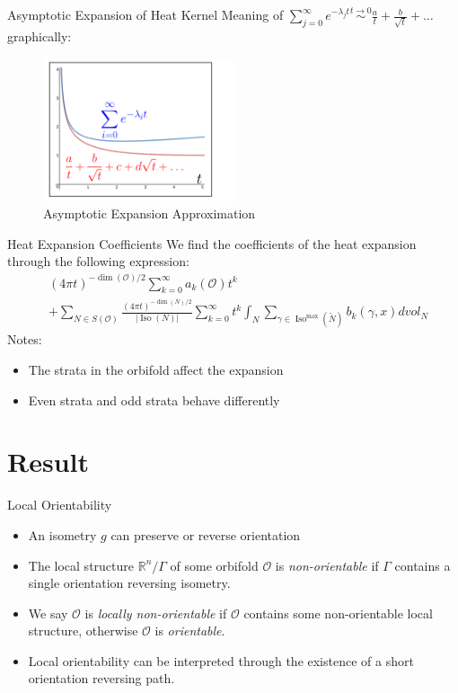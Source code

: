 \documentclass[12pt]{beamer}
\newcommand{\myabs}[1]{\vert#1\vert}
\DeclareMathOperator{\iso}{Iso}
\begin{document}
\begin{frame}{Asymptotic Expansion of Heat Kernel}
    Meaning of  
        $\sum_{j=0}^{\infty} e^{-\lambda_j t} \stackrel{t \to 0}{\sim} 
        \frac{a}{t} + \frac{b}{\sqrt{t}} + \dots$ graphically:
    \begin{figure}
        \includegraphics[width=0.5\textwidth]{images/heat_exp_graph2.png}
        \caption{Asymptotic Expansion Approximation}
    \end{figure}
\end{frame}

\begin{frame}{Heat Expansion Coefficients}
    We find the coefficients of the heat expansion through the following
    expression:
       \begin{align*}
           &{(4\pi t)}^{-\dim(\mathcal{O})/2}\sum_{k=0}^{\infty}a_k(\mathcal{O})t^k \\
            &+\sum_{N \in S(\mathcal{O})}\frac{{(4\pi t)}^{-\dim(N)/2}}{\myabs{\iso(N)}}\sum_{k=0}^{\infty}t^k\int_{N} \sum_{\gamma \in \iso^{\max}(\tilde{N})}b_k(\gamma,x) dvol_N
       \end{align*}
    Notes:
    \begin{itemize}
        \item The strata in the orbifold affect the expansion
        \item Even strata and odd strata behave differently
    \end{itemize}
\end{frame}

\section{Result}
\begin{frame}{Local Orientability}
    \begin{itemize}
        \item An isometry $g$ can preserve or reverse orientation
        \item<2-> The local structure $\mathbb{R}^n/\Gamma$ of some orbifold
            $\mathcal{O}$ is \emph{non-orientable} if $\Gamma$ contains a
            single orientation reversing isometry.
        \item<3-> We say $\mathcal{O}$ is \emph{locally non-orientable} if
            $\mathcal{O}$ contains some non-orientable local structure,
            otherwise $\mathcal{O}$ is \emph{orientable}.
        \item<4-> Local orientability can be interpreted through the
            existence of a short orientation reversing path.
    \end{itemize}
\end{frame}
\end{document}
